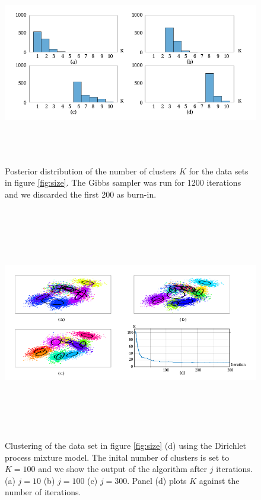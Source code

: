\documentclass[final,3p,times,twocolumn]{elsarticle}
\begin{document}
\begin{figure}
\includegraphics[width=\textwidth,height=3.5in]{drawing3.png}
\caption{Posterior distribution of the number of clusters $K$ for the data sets in figure \ref{fig:size}.
The Gibbs sampler was run for 1200 iterations and we discarded the first 200 as burn-in.}
\label{fig:hist}
\end{figure}


\begin{figure}
\includegraphics[width=\textwidth,height=4in]{drawing4.png}
\caption{Clustering of the data set in figure \ref{fig:size} (d) using the Dirichlet process mixture model. The inital number of clusters is set to $K=100$ and we show the output of the algorithm after $j$ iterations.
(a) $j=10$ (b) $j=100$ (c) $j=300$.
Panel (d) plots $K$ against the number of iterations.}
\label{fig:iter}
\end{figure}
\end{document}
